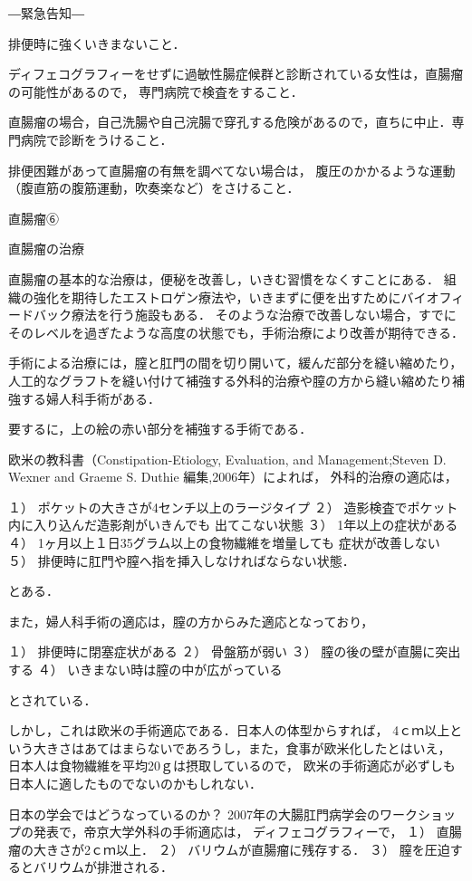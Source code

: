 ―緊急告知― 


排便時に強くいきまないこと．

ディフェコグラフィーをせずに過敏性腸症候群と診断されている女性は，直腸瘤の可能性があるので，
専門病院で検査をすること．

直腸瘤の場合，自己洗腸や自己浣腸で穿孔する危険があるので，直ちに中止．専門病院で診断をうけること．

排便困難があって直腸瘤の有無を調べてない場合は，
腹圧のかかるような運動（腹直筋の腹筋運動，吹奏楽など）をさけること．

直腸瘤⑥

直腸瘤の治療

直腸瘤の基本的な治療は，便秘を改善し，いきむ習慣をなくすことにある．
組織の強化を期待したエストロゲン療法や，いきまずに便を出すためにバイオフィードバック療法を行う施設もある．
そのような治療で改善しない場合，すでにそのレベルを過ぎたような高度の状態でも，手術治療により改善が期待できる．

手術による治療には，膣と肛門の間を切り開いて，緩んだ部分を縫い縮めたり，
人工的なグラフトを縫い付けて補強する外科的治療や膣の方から縫い縮めたり補強する婦人科手術がある． 




要するに，上の絵の赤い部分を補強する手術である．

欧米の教科書（Constipation-Etiology, Evaluation, and Management;Steven D. Wexner and Graeme S. Duthie 編集,2006年）によれば，
外科的治療の適応は，

１） ポケットの大きさが4センチ以上のラージタイプ
２） 造影検査でポケット内に入り込んだ造影剤がいきんでも
      出てこない状態
３） 1年以上の症状がある
４） 1ヶ月以上１日35グラム以上の食物繊維を増量しても
      症状が改善しない
５） 排便時に肛門や膣へ指を挿入しなければならない状態．

とある．

また，婦人科手術の適応は，膣の方からみた適応となっており，

１） 排便時に閉塞症状がある
２） 骨盤筋が弱い
３） 膣の後の壁が直腸に突出する
４） いきまない時は膣の中が広がっている

とされている．

しかし，これは欧米の手術適応である．日本人の体型からすれば，
4ｃｍ以上という大きさはあてはまらないであろうし，また，食事が欧米化したとはいえ，
日本人は食物繊維を平均20ｇは摂取しているので，
欧米の手術適応が必ずしも日本人に適したものでないのかもしれない．

日本の学会ではどうなっているのか？
2007年の大腸肛門病学会のワークショップの発表で，帝京大学外科の手術適応は，
ディフェコグラフィーで，
１） 直腸瘤の大きさが2ｃｍ以上．
２） バリウムが直腸瘤に残存する．
３） 膣を圧迫するとバリウムが排泄される．

